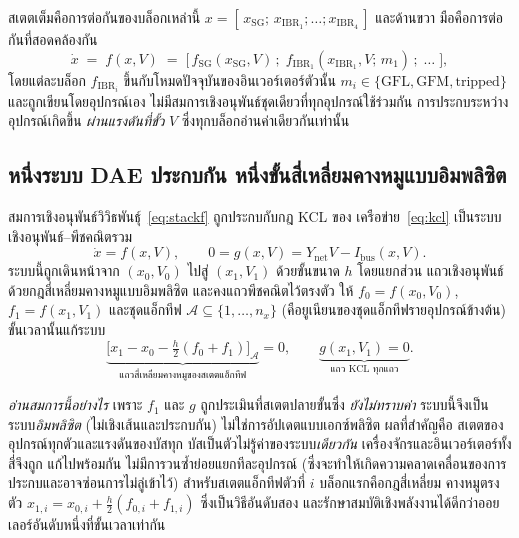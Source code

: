 \documentclass[12pt,a4paper]{article}
\begin{document}
สเตตเต็มคือการต่อกันของบล็อกเหล่านี้
$x=[\,x_{\mathrm{SG}};\,x_{\mathrm{IBR}_1};\dots;x_{\mathrm{IBR}_4}\,]$ และด้านขวา
มือคือการต่อกันที่สอดคล้องกัน
\begin{equation}
  \dot x \;=\; f(x,V)\;=\;
  \bigl[\,f_{\mathrm{SG}}(x_{\mathrm{SG}},V)\,;\;
          f_{\mathrm{IBR}_1}(x_{\mathrm{IBR}_1},V;\,m_1)\,;\;\dots\;\bigr],
  \label{eq:stackf}
\end{equation}
โดยแต่ละบล็อก $f_{\mathrm{IBR}_i}$ ขึ้นกับโหมดปัจจุบันของอินเวอร์เตอร์ตัวนั้น
$m_i\in\{\mathrm{GFL},\mathrm{GFM},\mathrm{tripped}\}$ และถูกเขียนโดยอุปกรณ์เอง
ไม่มีสมการเชิงอนุพันธ์ชุดเดียวที่ทุกอุปกรณ์ใช้ร่วมกัน การประกบระหว่างอุปกรณ์เกิดขึ้น
\emph{ผ่านแรงดันที่ขั้ว} $V$ ซึ่งทุกบล็อกอ่านค่าเดียวกันเท่านั้น

\subsection{หนึ่งระบบ DAE ประกบกัน หนึ่งขั้นสี่เหลี่ยมคางหมูแบบอิมพลิซิต}\label{sec:ts-couple}
สมการเชิงอนุพันธ์วิวิธพันธุ์~\eqref{eq:stackf} ถูกประกบกับกฎ KCL ของ
เครือข่าย~\eqref{eq:kcl} เป็นระบบเชิงอนุพันธ์--พีชคณิตรวม
\begin{equation}
  \dot x = f(x,V),\qquad 0 = g(x,V)=Y_{\mathrm{net}}V-I_{\mathrm{bus}}(x,V).
  \label{eq:dae}
\end{equation}
ระบบนี้ถูกเดินหน้าจาก $(x_0,V_0)$ ไปสู่ $(x_1,V_1)$ ด้วยขั้นขนาด $h$ โดยแยกส่วน
แถวเชิงอนุพันธ์ด้วยกฎสี่เหลี่ยมคางหมูแบบอิมพลิซิต และคงแถวพีชคณิตไว้ตรงตัว ให้
$f_0=f(x_0,V_0)$, $f_1=f(x_1,V_1)$ และชุดแอ็กทีฟ
$\mathcal{A}\subseteq\{1,\dots,n_x\}$ (คือยูเนียนของชุดแอ็กทีฟรายอุปกรณ์ข้างต้น)
ขั้นเวลานั้นแก้ระบบ
\begin{equation}
  \underbrace{\bigl[x_1-x_0-\tfrac{h}{2}(f_0+f_1)\bigr]_{\mathcal{A}}}
     _{\text{แถวสี่เหลี่ยมคางหมูของสเตตแอ็กทีฟ}}=0,
  \qquad
  \underbrace{g(x_1,V_1)=0}_{\text{แถว KCL ทุกแถว}}.
  \label{eq:trap}
\end{equation}

\emph{อ่านสมการนี้อย่างไร} เพราะ $f_1$ และ $g$ ถูกประเมินที่สเตตปลายขั้นซึ่ง
\emph{ยังไม่ทราบค่า} ระบบนี้จึงเป็นระบบ\emph{อิมพลิซิต} (ไม่เชิงเส้นและประกบกัน)
ไม่ใช่การอัปเดตแบบเอกซ์พลิซิต ผลที่สำคัญคือ สเตตของอุปกรณ์ทุกตัวและแรงดันของบัสทุก
บัสเป็นตัวไม่รู้ค่าของระบบ\emph{เดียวกัน} เครื่องจักรและอินเวอร์เตอร์ทั้งสี่จึงถูก
แก้ไปพร้อมกัน ไม่มีการวนซ้ำย่อยแยกทีละอุปกรณ์ (ซึ่งจะทำให้เกิดความคลาดเคลื่อนของการ
ประกบและอาจซ่อนการไม่ลู่เข้าไว้) สำหรับสเตตแอ็กทีฟตัวที่ $i$ บล็อกแรกคือกฎสี่เหลี่ยม
คางหมูตรงตัว $x_{1,i}=x_{0,i}+\tfrac{h}{2}(f_{0,i}+f_{1,i})$ ซึ่งเป็นวิธีอันดับสอง
และรักษาสมบัติเชิงพลังงานได้ดีกว่าออยเลอร์อันดับหนึ่งที่ขั้นเวลาเท่ากัน
\end{document}
